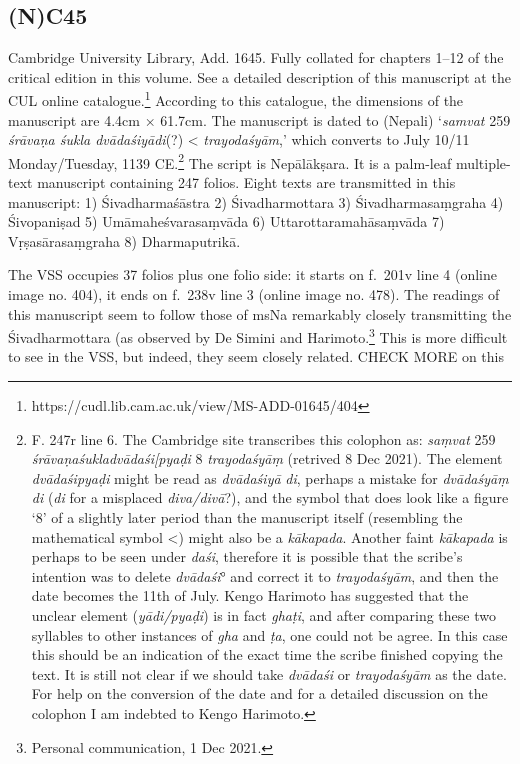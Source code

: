 \documentclass[12pt]{book}
\begin{document}
{%
\subsection{(N)C45}\label{nc45}}

Cambridge University Library, Add. 1645. Fully collated for chapters
1--12 of the critical edition in this volume. See a detailed description
of this manuscript at the CUL online catalogue.\footnote{https://cudl.lib.cam.ac.uk/view/MS-ADD-01645/404}
According to this catalogue, the dimensions of the manuscript are 4.4cm
× 61.7cm. The manuscript is dated to (Nepali) `\emph{samvat} 259
\emph{śrāvaṇa śukla dvādaśiyādi}(?) \textless{} \emph{trayodaśyām},'
which converts to July 10/11 Monday/Tuesday, 1139 CE.\footnote{F. 247r
  line 6. The Cambridge site transcribes this colophon as: \emph{saṃvat}
  259 \emph{śrāvaṇaśukladvādaśi{[}pyaḍi} 8 \emph{trayodaśyāṃ} (retrived
  8 Dec 2021). The element \emph{dvādaśipyaḍi} might be read as
  \emph{dvādaśiyā} \emph{di}, perhaps a mistake for \emph{dvādaśyāṃ}
  \emph{di} (\emph{di} for a misplaced \emph{diva/divā}?), and the
  symbol that does look like a figure `8' of a slightly later period
  than the manuscript itself (resembling the mathematical symbol
  \textless{}) might also be a \emph{kākapada}. Another faint
  \emph{kākapada} is perhaps to be seen under \emph{daśi}, therefore it
  is possible that the scribe's intention was to delete \emph{dvādaśi}°
  and correct it to \emph{trayodaśyām}, and then the date becomes the
  11th of July. Kengo Harimoto has suggested that the unclear element
  (\emph{yādi/pyaḍi}) is in fact \emph{ghaṭi}, and after comparing these
  two syllables to other instances of \emph{gha} and \emph{ṭa}, one
  could not be agree. In this case this should be an indication of the
  exact time the scribe finished copying the text. It is still not clear
  if we should take \emph{dvādaśi} or \emph{trayodaśyām} as the date.
  For help on the conversion of the date and for a detailed discussion
  on the colophon I am indebted to Kengo Harimoto.} The script is
Nepālākṣara. It is a palm-leaf multiple-text manuscript containing 247
folios. Eight texts are transmitted in this manuscript: 1)
Śivadharmaśāstra 2) Śivadharmottara 3) Śivadharmasaṃgraha 4) Śivopaniṣad
5) Umāmaheśvarasaṃvāda 6) Uttarottaramahāsaṃvāda 7) Vṛṣasārasaṃgraha 8)
Dharmaputrikā.

The VSS occupies 37 folios plus one folio side: it starts on f.~201v
line 4 (online image no. 404), it ends on f.~238v line 3 (online image
no. 478). The readings of this manuscript seem to follow those of msNa
remarkably closely transmitting the Śivadharmottara (as observed by De
Simini and Harimoto.\footnote{Personal communication, 1 Dec 2021.} This
is more difficult to see in the VSS, but indeed, they seem closely
related. CHECK MORE on this
\end{document}
